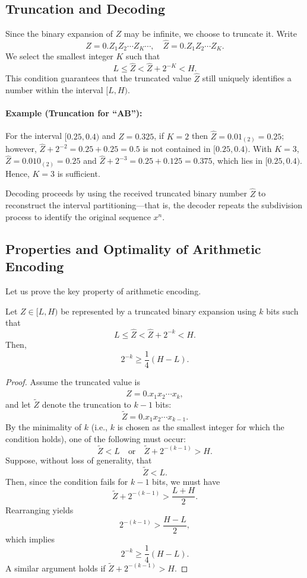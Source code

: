 \subsection{Truncation and Decoding}

Since the binary expansion of \(Z\) may be infinite, we choose to truncate it. Write
\[
Z = 0.Z_1Z_2\cdots Z_K\cdots, \quad \hat{Z} = 0.Z_1Z_2\cdots Z_K.
\]
We select the smallest integer \(K\) such that
\[
L \le \hat{Z} < \hat{Z} + 2^{-K} < H.
\]
This condition guarantees that the truncated value \(\hat{Z}\) still uniquely identifies a number within the interval \([L,H)\).

\paragraph{Example (Truncation for “AB”):}  
For the interval \([0.25,0.4)\) and \(Z=0.325\), if \(K=2\) then \(\hat{Z} = 0.01_{(2)} = 0.25\); however, \(\hat{Z} + 2^{-2} = 0.25+0.25 = 0.5\) is not contained in \([0.25,0.4)\). With \(K=3\), \(\hat{Z} = 0.010_{(2)} = 0.25\) and \(\hat{Z} + 2^{-3} = 0.25+0.125=0.375\), which lies in \([0.25,0.4)\). Hence, \(K=3\) is sufficient.

Decoding proceeds by using the received truncated binary number \(\hat{Z}\) to reconstruct the interval partitioning—that is, the decoder repeats the subdivision process to identify the original sequence \(x^n\).

\subsection{Properties and Optimality of Arithmetic Encoding}
Let us prove the key property of arithmetic encoding.

\begin{theorem}
Let \(Z \in [L,H)\) be represented by a truncated binary expansion using \(k\) bits such that
\[
L \le \hat{Z} < \hat{Z} + 2^{-k} < H.
\]
Then,
\[
2^{-k} \ge \frac{1}{4}(H-L).
\]
\end{theorem}
\begin{proof}
Assume the truncated value is 
\[
\hat{Z} = 0.x_1x_2\cdots x_k,
\]
and let \(\tilde{Z}\) denote the truncation to \(k-1\) bits:
\[
\tilde{Z} = 0.x_1x_2\cdots x_{k-1}.
\]
By the minimality of \(k\) (i.e., \(k\) is chosen as the smallest integer for which the condition holds), one of the following must occur:
\[
\tilde{Z} < L \quad \text{or} \quad \tilde{Z} + 2^{-(k-1)} > H.
\]
Suppose, without loss of generality, that
\[
\tilde{Z} < L.
\]
Then, since the condition fails for \(k-1\) bits, we must have 
\[
\tilde{Z} + 2^{-(k-1)} > \frac{L+H}{2}.
\]
Rearranging yields
\[
2^{-(k-1)} > \frac{H-L}{2},
\]
which implies
\[
2^{-k} \ge \frac{1}{4}(H-L).
\]
A similar argument holds if \(\tilde{Z} + 2^{-(k-1)} > H\).
\end{proof}

